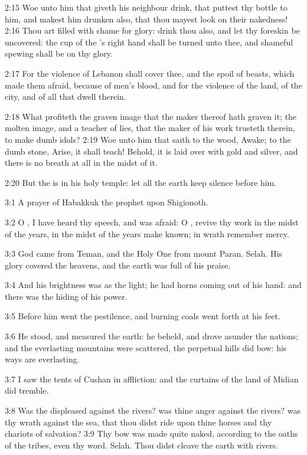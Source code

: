 2:15 Woe unto him that giveth his neighbour drink, that puttest thy
bottle to him, and makest him drunken also, that thou mayest look on
their nakedness!  2:16 Thou art filled with shame for glory: drink
thou also, and let thy foreskin be uncovered: the cup of the \LORD's
right hand shall be turned unto thee, and shameful spewing shall be on
thy glory.

2:17 For the violence of Lebanon shall cover thee, and the spoil of
beasts, which made them afraid, because of men's blood, and for the
violence of the land, of the city, and of all that dwell therein.

2:18 What profiteth the graven image that the maker thereof hath
graven it; the molten image, and a teacher of lies, that the maker of
his work trusteth therein, to make dumb idols?  2:19 Woe unto him that
saith to the wood, Awake; to the dumb stone, Arise, it shall teach!
Behold, it is laid over with gold and silver, and there is no breath
at all in the midst of it.

2:20 But the \LORD is in his holy temple: let all the earth keep
silence before him.

3:1 A prayer of Habakkuk the prophet upon Shigionoth.

3:2 O \LORD, I have heard thy speech, and was afraid: O \LORD, revive
thy work in the midst of the years, in the midst of the years make
known; in wrath remember mercy.

3:3 God came from Teman, and the Holy One from mount Paran. Selah. His
glory covered the heavens, and the earth was full of his praise.

3:4 And his brightness was as the light; he had horns coming out of
his hand: and there was the hiding of his power.

3:5 Before him went the pestilence, and burning coals went forth at
his feet.

3:6 He stood, and measured the earth: he beheld, and drove asunder the
nations; and the everlasting mountains were scattered, the perpetual
hills did bow: his ways are everlasting.

3:7 I saw the tents of Cushan in affliction: and the curtains of the
land of Midian did tremble.

3:8 Was the \LORD displeased against the rivers? was thine anger
against the rivers? was thy wrath against the sea, that thou didst
ride upon thine horses and thy chariots of salvation?  3:9 Thy bow was
made quite naked, according to the oaths of the tribes, even thy word.
Selah. Thou didst cleave the earth with rivers.

